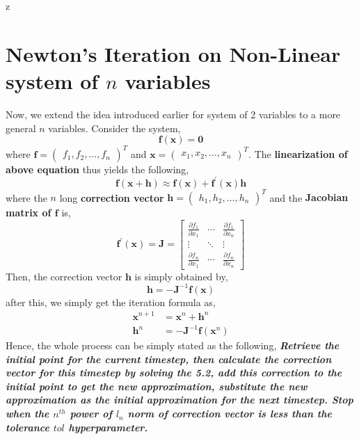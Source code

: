 z\documentclass[a4paper,12pt,twoside]{book}
\newcommand{\nll}[0]{\newline\newline}
\newcommand{\tit}[1]{\textit{#1}}
\begin{document}
\section{Newton's Iteration on Non-Linear system of $n$ variables}
Now, we extend the idea introduced earlier for system of 2 variables to a more general $n$ variables.
\nll
Consider the system,
\[ \mathbf{f}(\mathbf{x}) = \mathbf{0} \]
where $\mathbf{f} = \begin{pmatrix} f_1, f_2, \dots, f_n \end{pmatrix}^T$ and $\mathbf{x} = \begin{pmatrix} x_1, x_2, \dots, x_n \end{pmatrix}^T$. 
\nll
The \textbf{linearization of above equation} thus yields the following,
\begin{equation}
    \mathbf{f}(\mathbf{x} + \mathbf{h}) \approx \mathbf{f}(\mathbf{x}) + \mathbf{f}^\prime (\mathbf{x}) \mathbf{h}
\end{equation}
where the $n$ long \textbf{correction vector} $\mathbf{h} = \begin{pmatrix} h_1, h_2, \dots, h_n \end{pmatrix}^T$ and the \textbf{Jacobian matrix of $\mathbf{f}$} is,
\[ \mathbf{f}^\prime (\mathbf{x}) = \mathbf{J} = \begin{bmatrix} \frac{\partial f_1}{\partial x_1}& \cdots & \frac{\partial f_1}{\partial x_n}\\ \vdots & \ddots & \vdots \\ \frac{\partial f_n}{\partial x_1} & \cdots & \frac{\partial f_n}{\partial x_n}   \end{bmatrix} \]
Then, the correction vector $\mathbf{h}$ is simply obtained by,
\begin{equation}
    \boxed{\mathbf{h} = - \mathbf{J}^{-1} \mathbf{f}(\mathbf{x})}
\end{equation}
after this, we simply get the iteration formula as,
\begin{equation}
\begin{split}
    \mathbf{x}^{n+1} &= \mathbf{x}^n + \mathbf{h}^n\\
    \mathbf{h}^n &= -\mathbf{J}^{-1} \mathbf{f}(\mathbf{x}^n) 
    \end{split}
\end{equation}
Hence, the whole process can be simply stated as the following,
\nll
\textbf{\tit{Retrieve the initial point for the current timestep, then calculate the correction vector for this timestep by solving the 5.2, add this correction to the initial point to get the new approximation, substitute the new approximation as the initial approximation for the next timestep. Stop when the $n^{th}$ power of $l_n$ norm of correction vector is less than the tolerance $tol$ hyperparameter.}}
\end{document}
